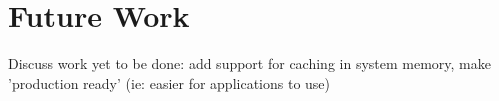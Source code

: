 \section{Future Work}
\label{sec:future}

Discuss work yet to be done:  add support for caching in system memory,  make 'production ready' (ie: easier for applications to use)